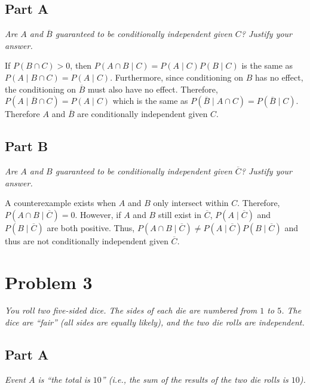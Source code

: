 \documentclass{article}
\begin{document}
\subsection*{Part A}

\textit{Are $ A $ and $ \overline{B} $ guaranteed to be conditionally
independent given $ C $? Justify your answer.}

\bigbreak

If $ P ( B \cap C ) > 0 $, then $ P (A \cap B \mid C) = P (A \mid C) P(B \mid C)
$ is the same as $ P(A \mid B \cap C) = P(A \mid C) $. Furthermore, since
conditioning on $ B $ has no effect, the conditioning on $ \overline{B} $ must
also have no effect. Therefore, $ P(A \mid \overline{B} \cap C) = P(A \mid C) $
which is the same as $ P(\overline{B} \mid A \cap C) = P(\overline{B} \mid C) $.
Therefore $ A $ and $ \overline{B} $ are conditionally independent given $ C $.

\subsection*{Part B}

\textit{Are $ A $ and $ B $ guaranteed to be conditionally independent given $
\overline{C} $? Justify your answer.}

\bigbreak

A counterexample exists when $ A $ and $ B $ only intersect within $ C $.
Therefore, $ P(A \cap B \mid \overline{C}) = 0 $. However, if $ A $ and $ B $
still exist in $ \overline{C} $, $ P(A \mid \overline{C}) $ and $ P(B \mid
\overline{C}) $ are both positive. Thus, $ P(A \cap B \mid \overline{C}) \neq
P(A \mid \overline{C}) P(B \mid \overline{C}) $ and thus are not conditionally
independent given $ \overline{C} $.

\section*{Problem 3}

\textit{You roll two five-sided dice. The sides of each die are numbered from $
1 $ to $ 5 $. The dice are “fair” (all sides are equally likely), and the two
die rolls are independent.}

\subsection*{Part A}

\textit{Event $ A $ is “the total is $ 10 $” (i.e., the sum of the results of
the two die rolls is $ 10 $).}
\end{document}
